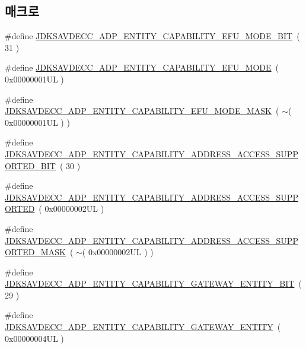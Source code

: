\subsection*{매크로}
\begin{DoxyCompactItemize}
\item 
\#define \hyperlink{group__adp__entity__capability_gab47fff33d6169056a01232ee4de39324}{J\+D\+K\+S\+A\+V\+D\+E\+C\+C\+\_\+\+A\+D\+P\+\_\+\+E\+N\+T\+I\+T\+Y\+\_\+\+C\+A\+P\+A\+B\+I\+L\+I\+T\+Y\+\_\+\+E\+F\+U\+\_\+\+M\+O\+D\+E\+\_\+\+B\+IT}~( 31 )
\item 
\#define \hyperlink{group__adp__entity__capability_gad4234e4df7d93fe889842e608de6ccd4}{J\+D\+K\+S\+A\+V\+D\+E\+C\+C\+\_\+\+A\+D\+P\+\_\+\+E\+N\+T\+I\+T\+Y\+\_\+\+C\+A\+P\+A\+B\+I\+L\+I\+T\+Y\+\_\+\+E\+F\+U\+\_\+\+M\+O\+DE}~( 0x00000001\+U\+L )
\item 
\#define \hyperlink{group__adp__entity__capability_ga5cb0eff7a147bda11441c01c49ff037c}{J\+D\+K\+S\+A\+V\+D\+E\+C\+C\+\_\+\+A\+D\+P\+\_\+\+E\+N\+T\+I\+T\+Y\+\_\+\+C\+A\+P\+A\+B\+I\+L\+I\+T\+Y\+\_\+\+E\+F\+U\+\_\+\+M\+O\+D\+E\+\_\+\+M\+A\+SK}~( $\sim$( 0x00000001\+U\+L ) )
\item 
\#define \hyperlink{group__adp__entity__capability_ga9eaa1d879826bb750e553a490e1ecc8f}{J\+D\+K\+S\+A\+V\+D\+E\+C\+C\+\_\+\+A\+D\+P\+\_\+\+E\+N\+T\+I\+T\+Y\+\_\+\+C\+A\+P\+A\+B\+I\+L\+I\+T\+Y\+\_\+\+A\+D\+D\+R\+E\+S\+S\+\_\+\+A\+C\+C\+E\+S\+S\+\_\+\+S\+U\+P\+P\+O\+R\+T\+E\+D\+\_\+\+B\+IT}~( 30 )
\item 
\#define \hyperlink{group__adp__entity__capability_ga404796c0b67160efa7ea8746d7674d7e}{J\+D\+K\+S\+A\+V\+D\+E\+C\+C\+\_\+\+A\+D\+P\+\_\+\+E\+N\+T\+I\+T\+Y\+\_\+\+C\+A\+P\+A\+B\+I\+L\+I\+T\+Y\+\_\+\+A\+D\+D\+R\+E\+S\+S\+\_\+\+A\+C\+C\+E\+S\+S\+\_\+\+S\+U\+P\+P\+O\+R\+T\+ED}~( 0x00000002\+U\+L )
\item 
\#define \hyperlink{group__adp__entity__capability_gad858f615cc2f28e914274e605bb77881}{J\+D\+K\+S\+A\+V\+D\+E\+C\+C\+\_\+\+A\+D\+P\+\_\+\+E\+N\+T\+I\+T\+Y\+\_\+\+C\+A\+P\+A\+B\+I\+L\+I\+T\+Y\+\_\+\+A\+D\+D\+R\+E\+S\+S\+\_\+\+A\+C\+C\+E\+S\+S\+\_\+\+S\+U\+P\+P\+O\+R\+T\+E\+D\+\_\+\+M\+A\+SK}~( $\sim$( 0x00000002\+U\+L ) )
\item 
\#define \hyperlink{group__adp__entity__capability_ga45b980bdd0a8b228276add1c6d1e869d}{J\+D\+K\+S\+A\+V\+D\+E\+C\+C\+\_\+\+A\+D\+P\+\_\+\+E\+N\+T\+I\+T\+Y\+\_\+\+C\+A\+P\+A\+B\+I\+L\+I\+T\+Y\+\_\+\+G\+A\+T\+E\+W\+A\+Y\+\_\+\+E\+N\+T\+I\+T\+Y\+\_\+\+B\+IT}~( 29 )
\item 
\#define \hyperlink{group__adp__entity__capability_gab380f4a0bbcc1906ecfb1e9884e42b76}{J\+D\+K\+S\+A\+V\+D\+E\+C\+C\+\_\+\+A\+D\+P\+\_\+\+E\+N\+T\+I\+T\+Y\+\_\+\+C\+A\+P\+A\+B\+I\+L\+I\+T\+Y\+\_\+\+G\+A\+T\+E\+W\+A\+Y\+\_\+\+E\+N\+T\+I\+TY}~( 0x00000004\+U\+L )

\end{DoxyCompactItemize}
